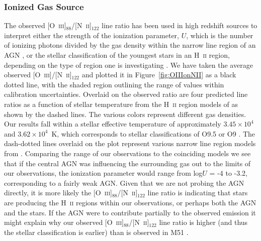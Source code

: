 \subsubsection{Ionized Gas Source}\label{oiiionnii}
The observed [O~\textsc{iii}]$_{88}$/[N~\textsc{ii}]$_{122}$ line ratio has been used in high redshift sources to interpret either the strength of the ionization parameter, $U$, which is the number of ionizing photons divided by the gas density within the narrow line region of an AGN \citep{2009ApJ...701.1147A}, or the stellar classification of the youngest stars in an H~\textsc{ii} region, depending on the type of region one is investigating \citep{2011ApJ...740L..29F}.  We have taken the average observed [O~\textsc{iii}]/[N~\textsc{ii}]$_{122}$ and plotted it in Figure~\ref{fig:OIIIonNII} as a black dotted line, with the shaded region outlining the range of values within calibration uncertainties.  Overlaid on the observed ratio are four predicted line ratios as a function of stellar temperature from the H~\textsc{ii} region models of \citet{1985ApJS...57..349R} as shown by the dashed lines.  The various colors represent different gas densities.  Our results fall within a stellar effective temperature of approximately $3.45 \times 10^{4}$ and $3.62 \times 10^{4}$~K, which corresponds to stellar classifications of O9.5 or O9 \citep{1996ApJ...460..914V}.  The dash-dotted lines overlaid on the plot represent various narrow line region models from \citet{2004ApJS..153....9G}.  Comparing the range of our observations to the coinciding models we see that if the central AGN was influencing the surrounding gas out to the limits of our observations, the ionization parameter would range from log$U$ = -4 to -3.2, corresponding to a fairly weak AGN.  Given that we are not probing the AGN directly, it is more likely the [O~\textsc{iii}]$_{88}$/[N~\textsc{ii}]$_{122}$ line ratio is indicating that stars are producing the H~\textsc{ii} regions within our observations, or perhaps both the AGN and the stars.  If the AGN were to contribute partially to the observed emission it might explain why our observed [O~\textsc{iii}]$_{88}$/[N~\textsc{ii}]$_{122}$ line ratio is higher (and thus the stellar classification is earlier) than is observed in M51 \citep{parkin_2013}.

